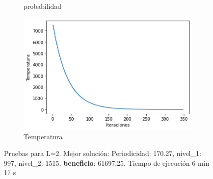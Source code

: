 \documentclass[a4paper,12pt]{article}
\begin{document}
\begin{figure}[H]
\begin{subfigure}{0.24\textwidth}
			\caption{probabilidad}
		\end{subfigure}
		\hfill
		\begin{subfigure}{0.24\textwidth}
			\centering
			\includegraphics[width=\textwidth]{include/L2/temperatura.png}
			\caption{Temperatura}
		\end{subfigure}
		\caption{Pruebas para L=2. Mejor solución: Periodicidad: 170.27, nivel_1: 997,  nivel_2: 1515, \textbf{beneficio}: 61697.25. Tiempo de ejecución 6 min 17 s}
	\end{figure}
\end{document}
